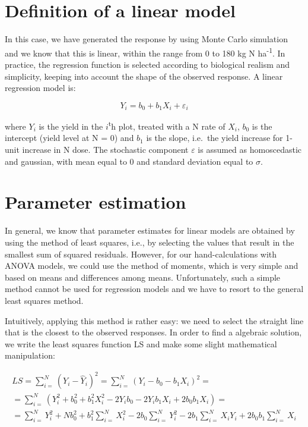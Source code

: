 \documentclass[a4paper,12pt,oneside]{book}
\begin{document}
\hypertarget{definition-of-a-linear-model}{%
\section{Definition of a linear model}\label{definition-of-a-linear-model}}

In this case, we have generated the response by using Monte Carlo simulation and we know that this is linear, within the range from 0 to 180 kg N ha\textsuperscript{-1}. In practice, the regression function is selected according to biological realism and simplicity, keeping into account the shape of the observed response. A linear regression model is:

\[Y_i = b_0 + b_1 X_i + \varepsilon_i\]

where \(Y_i\) is the yield in the \(i\)\textsuperscript{t}h plot, treated with a N rate of \(X_i\), \(b_0\) is the intercept (yield level at N = 0) and \(b_1\) is the slope, i.e.~the yield increase for 1-unit increase in N dose. The stochastic component \(\varepsilon\) is assumed as homoscedastic and gaussian, with mean equal to 0 and standard deviation equal to \(\sigma\).

\hypertarget{parameter-estimation-2}{%
\section{Parameter estimation}\label{parameter-estimation-2}}

In general, we know that parameter estimates for linear models are obtained by using the method of least squares, i.e., by selecting the values that result in the smallest sum of squared residuals. However, for our hand-calculations with ANOVA models, we could use the method of moments, which is very simple and based on means and differences among means. Unfortunately, such a simple method cannot be used for regression models and we have to resort to the general least squares method.

Intuitively, applying this method is rather easy: we need to select the straight line that is the closest to the observed responses. In order to find a algebraic solution, we write the least squares function LS and make some slight mathematical manipulation:

\[\begin{array}{l}
LS = \sum\limits_{i = }^N {\left( {{Y_i} - \hat Y_i} \right)^2 = \sum\limits_{i = }^N {{{\left( {{Y_i} - {b_0} - {b_1}{X_i}} \right)}^2}}  = } \\
 = \sum\limits_{i = }^N {\left( {Y_i^2 + b_0^2 + b_1^2X_i^2 - 2{Y_i}{b_0} - 2{Y_i}{b_1}{X_i} + 2{b_0}{b_1}{X_i}} \right)}  = \\
 = \sum\limits_{i = }^N {Y_i^2 + Nb_0^2 + b_1^2\sum\limits_{i = }^N {X_i^2 - 2{b_0}\sum\limits_{i = }^N {Y_i^2 - 2{b_1}\sum\limits_{i = }^N {{X_i}{Y_i} + } } } } 2{b_0}{b_1}\sum\limits_{i = }^N {{X_i}} 
\end{array} \]
\end{document}
